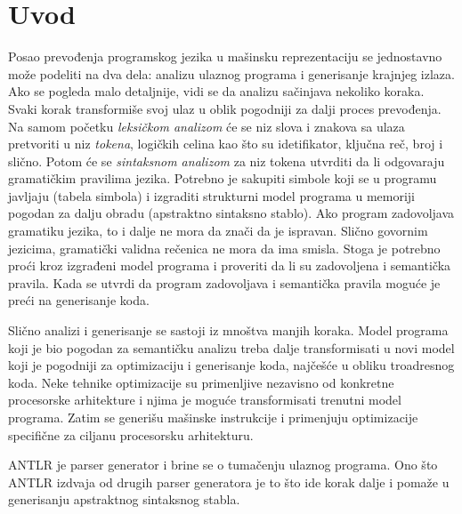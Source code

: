 \chapter{Uvod}

Posao prevođenja programskog jezika u mašinsku reprezentaciju se jednostavno može podeliti na dva dela: analizu ulaznog programa i generisanje krajnjeg izlaza\cite{dragon}. 
Ako se pogleda malo detaljnije, vidi se da analizu sačinjava nekoliko koraka. 
Svaki korak transformiše svoj ulaz u oblik pogodniji za dalji proces prevođenja. 
Na samom početku \emph{leksičkom analizom} će se niz slova i znakova sa ulaza pretvoriti u niz \emph{tokena}, logičkih celina kao što su idetifikator, ključna reč, broj i slično. 
Potom će se \emph{sintaksnom analizom} za niz tokena utvrditi da li odgovaraju gramatičkim pravilima jezika. 
Potrebno je sakupiti simbole koji se u programu javljaju (tabela simbola) i izgraditi strukturni model programa u memoriji pogodan za dalju obradu (apstraktno sintaksno stablo).
Ako program zadovoljava gramatiku jezika, to i dalje ne mora da znači da je ispravan.
Slično govornim jezicima, gramatički validna rečenica ne mora da ima smisla.
Stoga je potrebno proći kroz izgrađeni model programa i proveriti da li su zadovoljena i semantička pravila. 
Kada se utvrdi da program zadovoljava i semantička pravila moguće je preći na generisanje koda.

Slično analizi i generisanje se sastoji iz mnoštva manjih koraka.
Model programa koji je bio pogodan za semantičku analizu treba dalje transformisati u novi model koji je pogodniji za optimizaciju i generisanje koda, najčešće u obliku troadresnog koda.
Neke tehnike optimizacije su primenljive nezavisno od konkretne procesorske arhitekture i njima je moguće transformisati trenutni model programa.
Zatim se generišu mašinske instrukcije i primenjuju optimizacije specifične za ciljanu procesorsku arhitekturu.

ANTLR je parser generator i brine se o tumačenju ulaznog programa.
Ono što ANTLR izdvaja od drugih parser generatora je to što ide korak dalje i pomaže u generisanju apstraktnog sintaksnog stabla.

